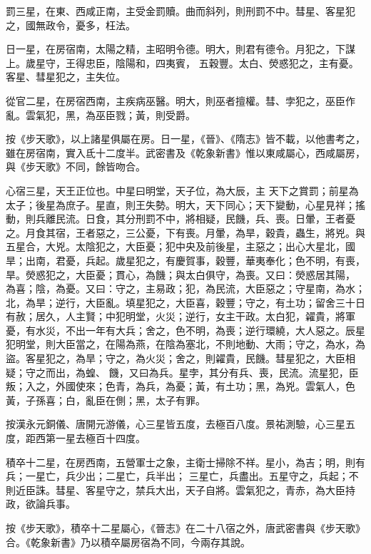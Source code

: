 \begin{pinyinscope}
 罰三星，在東、西咸正南，主受金罰贖。曲而斜列，則刑罰不中。彗星、客星犯之，國無政令，憂多，枉法。



 日一星，在房宿南，太陽之精，主昭明令德。明大，則君有德令。月犯之，下謀上。歲星守，王得忠臣，陰陽和，四夷賓，
 五穀豐。太白、熒惑犯之，主有憂。客星、彗星犯之，主失位。



 從官二星，在房宿西南，主疾病巫醫。明大，則巫者擅權。彗、孛犯之，巫臣作亂。雲氣犯，黑，為巫臣戮；黃，則受爵。



 按《步天歌》，以上諸星俱屬在房。日一星，《晉》、《隋志》皆不載，以他書考之，雖在房宿南，實入氐十二度半。武密書及《乾象新書》惟以東咸屬心，西咸屬房，與《步天歌》不同，餘皆吻合。



 心宿三星，天王正位也。中星曰明堂，天子位，為大辰，主
 天下之賞罰；前星為太子；後星為庶子。星直，則王失勢。明大，天下同心；天下變動，心星見祥；搖動，則兵離民流。日食，其分刑罰不中，將相疑，民饑，兵、喪。日暈，王者憂之。月食其宿，王者惡之，三公憂，下有喪。月暈，為旱，穀貴，蟲生，將兇。與五星合，大兇。太陰犯之，大臣憂；犯中央及前後星，主惡之；出心大星北，國旱；出南，君憂，兵起。歲星犯之，有慶賀事，穀豐，華夷奉化；色不明，有喪，旱。熒惑犯之，大臣憂；貫心，為饑；與太白俱守，為喪。又曰：熒惑居其陽，
 為喜；陰，為憂。又曰：守之，主易政；犯，為民流，大臣惡之；守星南，為水；北，為旱；逆行，大臣亂。填星犯之，大臣喜，穀豐；守之，有土功；留舍三十日有赦；居久，人主賢；中犯明堂，火災；逆行，女主干政。太白犯，糴貴，將軍憂，有水災，不出一年有大兵；舍之，色不明，為喪；逆行環繞，大人惡之。辰星犯明堂，則大臣當之，在陽為燕，在陰為塞北，不則地動、大雨；守之，為水，為盜。客星犯之，為旱；守之，為火災；舍之，則糴貴，民饑。彗星犯之，大臣相疑；守之而出，為蝗、
 饑，又曰為兵。星孛，其分有兵、喪，民流。流星犯，臣叛；入之，外國使來；色青，為兵，為憂；黃，有土功；黑，為兇。雲氣人，色黃，子孫喜；白，亂臣在側；黑，太子有罪。



 按漢永元銅儀、唐開元游儀，心三星皆五度，去極百八度。景祐測驗，心三星五度，距西第一星去極百十四度。



 積卒十二星，在房西南，五營軍士之象，主衛士掃除不祥。星小，為吉；明，則有兵；一星亡，兵少出；二星亡，兵半出；
 三星亡，兵盡出。五星守之，兵起；不則近臣誅。彗星、客星守之，禁兵大出，天子自將。雲氣犯之，青赤，為大臣持政，欲論兵事。



 按《步天歌》，積卒十二星屬心，《晉志》在二十八宿之外，唐武密書與《步天歌》合。《乾象新書》乃以積卒屬房宿為不同，今兩存其說。




\end{pinyinscope}
